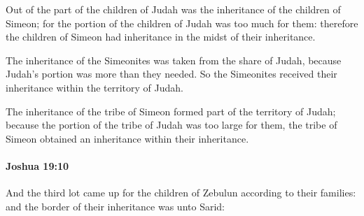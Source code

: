 			\begin{versebox}
					\item[BHS] 
					\item[ASV] Out of the part of the children of Judah was the inheritance of the children of Simeon; for the portion of the children of Judah was too much for them: therefore the children of Simeon had inheritance in the midst of their inheritance.
					\item[NIV] The inheritance of the Simeonites was taken from the share of Judah, because Judah’s portion was more than they needed. So the Simeonites received their inheritance within the territory of Judah.
					\item[NRSV] The inheritance of the tribe of Simeon formed part of the territory of Judah; because the portion of the tribe of Judah was too large for them, the tribe of Simeon obtained an inheritance within their inheritance.
			\end{versebox}

		\paragraph{Joshua 19:10} %
			\label{JOSHUA-19-10}

			And the third lot came up for the children of Zebulun according to their families: and the border of their inheritance was unto Sarid:

